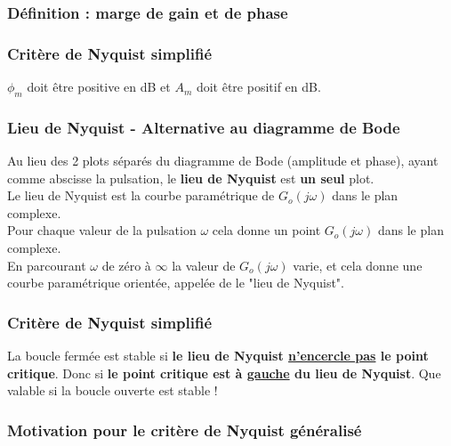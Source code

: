 \documentclass[document.tex]{subfiles}
\begin{document}
\subsubsection{Définition : marge de gain et de phase}


\subsubsection{Critère de Nyquist simplifié}
 $\phi_m$ doit être positive en dB et $A_m$ doit être positif en dB.\\

\subsubsection{Lieu de Nyquist - Alternative au diagramme de Bode}

Au lieu des 2 plots séparés du diagramme de Bode (amplitude et phase), ayant comme abscisse la pulsation, le \textbf{lieu de Nyquist} est \textbf{un seul} plot.\\

Le lieu de Nyquist est la courbe paramétrique de $G_o(j\omega)$ dans le plan complexe.\\

Pour chaque valeur de la pulsation $\omega$ cela donne un point $G_o(j\omega)$ dans le plan complexe.\\

En parcourant $\omega$ de zéro à $\infty$ la valeur de $G_o(j\omega)$ varie, et cela donne une courbe paramétrique orientée, appelée de le "lieu de Nyquist".

\subsubsection{Critère de Nyquist simplifié}


La boucle fermée est stable si \textbf{le lieu de Nyquist \underline{n'encercle pas} le point critique}. Donc si \textbf{le point critique est à \underline{gauche} du lieu de Nyquist}. Que valable si la boucle ouverte est stable !

\subsubsection{Motivation pour le critère de Nyquist généralisé}

\end{document}
